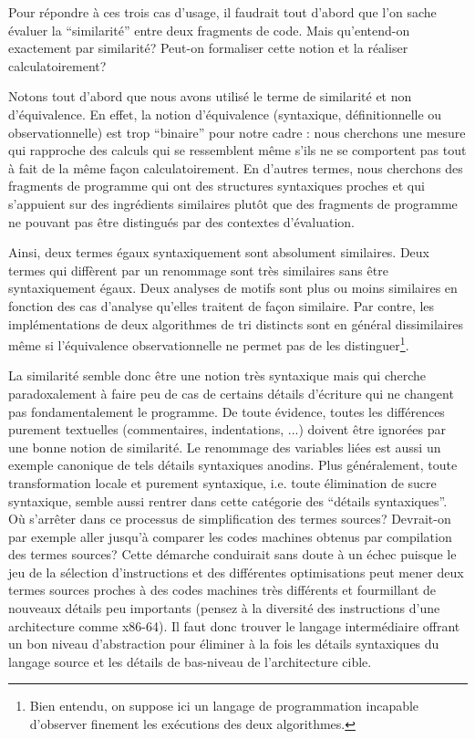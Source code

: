 \medskip

Pour répondre à ces trois cas d'usage, il faudrait tout d'abord que
l'on sache évaluer la ``similarité'' entre deux fragments de
code. Mais qu'entend-on exactement par similarité? Peut-on
formaliser cette notion et la réaliser calculatoirement?

Notons tout d'abord que nous avons utilisé le terme de similarité et
non d'équivalence. En effet, la notion d'équivalence (syntaxique,
définitionnelle ou observationnelle) est trop ``binaire'' pour notre
cadre : nous cherchons une mesure qui rapproche des calculs qui se
ressemblent même s'ils ne se comportent pas tout à fait de la même
façon calculatoirement. En d'autres termes, nous cherchons des
fragments de programme qui ont des structures syntaxiques proches et
qui s'appuient sur des ingrédients similaires plutôt que des fragments
de programme ne pouvant pas être distingués par des contextes
d'évaluation.

Ainsi, deux termes égaux syntaxiquement sont absolument similaires.
Deux termes qui diffèrent par un renommage sont très similaires sans
être syntaxiquement égaux. Deux analyses de motifs sont plus ou
moins similaires en fonction des cas d'analyse qu'elles traitent
de façon similaire. Par contre, les implémentations de deux
algorithmes de tri distincts sont en général dissimilaires
même si l'équivalence observationnelle ne permet pas de les
distinguer\footnote{Bien entendu, on suppose ici
un langage de programmation incapable d'observer finement
les exécutions des deux algorithmes.}.

La similarité semble donc être une notion très syntaxique mais qui
cherche paradoxalement à faire peu de cas de certains détails
d'écriture qui ne changent pas fondamentalement le programme. De toute évidence, toutes les différences purement textuelles
(commentaires, indentations, ...) doivent être ignorées par une bonne
notion de similarité. Le renommage des variables liées est aussi un
exemple canonique de tels détails syntaxiques anodins. Plus
généralement, toute transformation locale et purement syntaxique,
i.e. toute élimination de sucre syntaxique, semble aussi rentrer dans
cette catégorie des ``détails syntaxiques''. Où s'arrêter dans ce
processus de simplification des termes sources? Devrait-on par exemple aller
jusqu'à comparer les codes machines obtenus par compilation des termes
sources? Cette démarche conduirait sans doute à un échec puisque le
jeu de la sélection d'instructions et des différentes optimisations
peut mener deux termes sources proches à des codes machines très différents
et fourmillant de nouveaux détails peu importants (pensez à la
diversité des instructions d'une architecture comme x86-64). Il faut
donc trouver le langage intermédiaire offrant un bon niveau
d'abstraction pour éliminer à la fois les détails syntaxiques
du langage source et les détails de bas-niveau de l'architecture cible.

